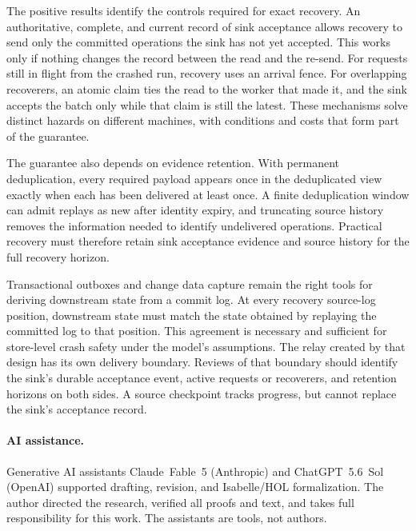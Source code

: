 \documentclass[sigplan,10pt]{acmart}
\theoremstyle{plain}
\theoremstyle{definition}
\begin{document}
The positive results identify the controls required for exact recovery.
An authoritative, complete, and current record of sink acceptance allows
recovery to send only the committed operations the sink has not yet
accepted. This works only if nothing changes the record between the read
and the re-send. For requests still in flight from the crashed run,
recovery uses an arrival fence. For overlapping recoverers, an atomic
claim ties the read to the worker that made it, and the sink accepts the
batch only while that claim is still the latest. These mechanisms solve distinct
hazards on different machines, with conditions and costs that form part of the
guarantee.

The guarantee also depends on evidence retention. With permanent
deduplication, every required payload appears once in the deduplicated
view exactly when each has been delivered at least once. A
finite deduplication window can admit replays as new after identity
expiry, and truncating source history removes the information needed to
identify undelivered operations. Practical recovery must therefore retain
sink acceptance evidence and source history for the full recovery horizon.

Transactional outboxes and change data capture remain the right tools
for deriving downstream state from a commit log. At every recovery
source-log position, downstream state must match the state obtained by
replaying the committed log to that position. This agreement is necessary
and sufficient for store-level crash safety under the model's assumptions.
The relay created by that design has its own delivery boundary. Reviews of
that boundary should identify the sink's durable acceptance event, active
requests or recoverers, and retention horizons on both sides. A source
checkpoint tracks progress, but cannot replace the sink's acceptance record.

\paragraph{AI assistance.}
Generative AI assistants \mbox{Claude Fable~5} (Anthropic) and
\mbox{ChatGPT~5.6 Sol} (OpenAI) supported drafting, revision, and
Isabelle/HOL formalization. The author directed the research, verified all
proofs and text, and takes full responsibility for this work. The assistants
are tools, not authors.



\flushcolsend
\end{document}
